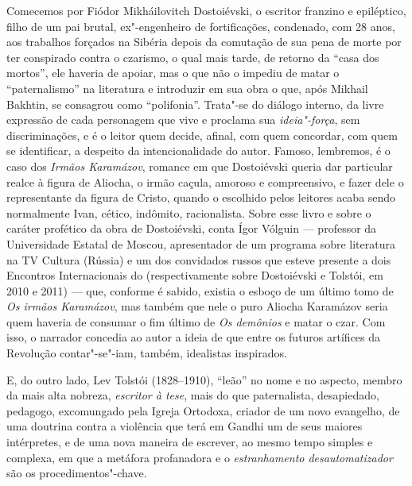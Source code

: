 Comecemos por Fiódor Mikháilovitch Dostoiévski, o
escritor franzino e epiléptico, filho de um pai brutal,
ex"-engenheiro de fortificações, condenado, com 28 anos, aos
trabalhos forçados na Sibéria depois da comutação de sua pena de
morte por ter conspirado contra o czarismo, o qual mais tarde,
de retorno da ``casa dos mortos'', ele haveria de apoiar, mas o
que não o impediu de matar o ``paternalismo'' na literatura e
introduzir em sua obra o que, após Mikhail Bakhtin, se consagrou
como ``polifonia''. Trata"-se do diálogo interno, da livre
expressão de cada personagem que vive e proclama sua
\emph{ideia"-força}, sem discriminações, e é o leitor quem
decide, afinal, com quem concordar, com quem se identificar, a
despeito da intencionalidade do autor. Famoso, lembremos, é o caso dos
\emph{Irmãos Karamázov}, romance em que Dostoiévski queria
dar particular realce à figura de Aliocha, o irmão caçula,
amoroso e compreensivo, e fazer dele o representante da figura
de Cristo, quando o escolhido pelos leitores acaba sendo
normalmente Ivan, cético, indômito, racionalista. Sobre esse
livro e sobre o caráter profético da obra de Dostoiévski, conta
Ígor Vólguin --- professor da Universidade Estatal de Moscou,
apresentador de um programa sobre literatura na TV Cultura
(Rússia) e um dos convidados russos que esteve presente a dois
Encontros Internacionais do  (respectivamente sobre
Dostoiévski e Tolstói, em 2010 e 2011) --- que, conforme é sabido,
existia o esboço de um último tomo de \emph{Os irmãos Karamázov},
mas também que nele o puro Aliocha Karamázov seria quem haveria
de consumar o fim último de \emph{Os demônios} e matar o czar.
Com isso, o narrador concedia ao autor a ideia de que entre os
futuros artífices da Revolução contar"-se"-iam, também,
idealistas inspirados.

E, do outro lado, Lev Tolstói (1828--1910), ``leão'' no nome e
no aspecto, membro da mais alta nobreza, \emph{escritor à tese},
mais do que paternalista, desapiedado, pedagogo, excomungado pela
Igreja Ortodoxa, criador de um novo evangelho, de uma doutrina
contra a violência que terá em Gandhi um de seus maiores
intérpretes, e de uma nova maneira de escrever, ao mesmo
tempo simples e complexa, em que a metáfora profanadora e o
\emph{estranhamento desautomatizador} são os procedimentos"-chave.

